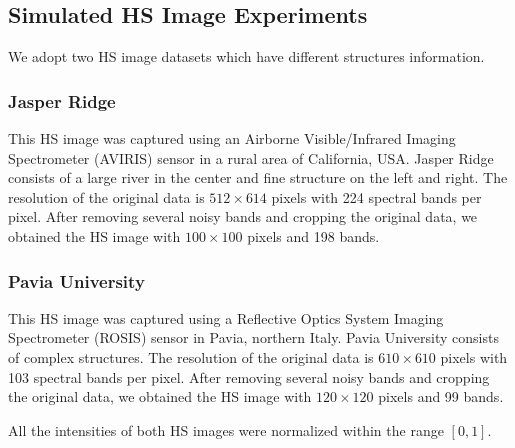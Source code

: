 \documentclass[10pt,journal]{IEEEtran}
\begin{document}
\subsection{Simulated HS Image Experiments}
% 

% 
% 

% 

We adopt two HS image datasets which have different structures information.

\subsubsection{Jasper Ridge}  This HS image was captured using an Airborne Visible/Infrared Imaging Spectrometer (AVIRIS) sensor in a rural area of California, USA.
Jasper Ridge consists of a large river in the center and fine structure on the left and right.
The resolution of the original data is $512 \times 614$ pixels with 224 spectral bands per pixel.
After removing several noisy bands and cropping the original data, we obtained the HS image with $100 \times 100$ pixels and 198 bands.

\subsubsection{Pavia University}  This HS image was captured using a Reflective Optics System Imaging Spectrometer (ROSIS) sensor in Pavia, northern Italy.
Pavia University consists of complex structures.
The resolution of the original data is $610 \times 610$ pixels with 103 spectral bands per pixel.
After removing several noisy bands and cropping the original data, we obtained the HS image with $120 \times 120$ pixels and 99 bands.

All the intensities of both HS images were normalized within the range $[0, 1]$.
\end{document}
